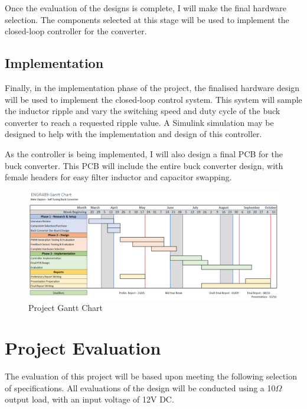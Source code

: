 \documentclass[11pt, a4paper, oneside]{report}
\begin{document}
Once the evaluation of the designs is complete, I will make the final hardware selection. The components selected at this stage will be used to implement the closed-loop controller for the converter.

\subsection{Implementation}

Finally, in the implementation phase of the project, the finalised hardware design will be used to implement the closed-loop control system. This system will sample the inductor ripple and vary the switching speed and duty cycle of the buck converter to reach a requested ripple value. A Simulink simulation may be designed to help with the implementation and design of this controller.

As the controller is being implemented, I will also design a final PCB for the buck converter. This PCB will include the entire buck converter design, with female headers for easy filter inductor and capacitor swapping.

\begin{figure}[!h]
	\begin{center}
		\includegraphics[width = \linewidth]{gantt.png}
		\caption{Project Gantt Chart}
		\label{fig:gantt}
	\end{center}
\end{figure}

\newpage
\section{Project Evaluation}

The evaluation of this project will be based upon meeting the following selection of specifications. All evaluations of the design will be conducted using a 10$\Omega$ output load, with an input voltage of 12V DC.
\end{document}
